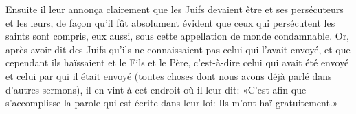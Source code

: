 Ensuite il leur annonça clairement
	que les Juifs devaient être et ses persécuteurs et les leurs,
	de façon qu’il fût absolument évident que ceux qui persécutent les saints
	sont compris, eux aussi, sous cette appellation de monde condamnable.
Or, après avoir dit des Juifs
		qu’ils ne connaissaient pas celui qui l’avait envoyé,
	et que cependant ils haïssaient et le Fils et le Père,
	c’est-à-dire celui qui avait été envoyé et celui par qui il était envoyé
	(toutes choses dont nous avons déjà parlé dans d’autres sermons),
	il en vint à cet endroit où il leur dit:
	«C’est afin que s’accomplisse la parole qui est écrite dans leur loi:
	Ils m’ont haï gratuitement.»
